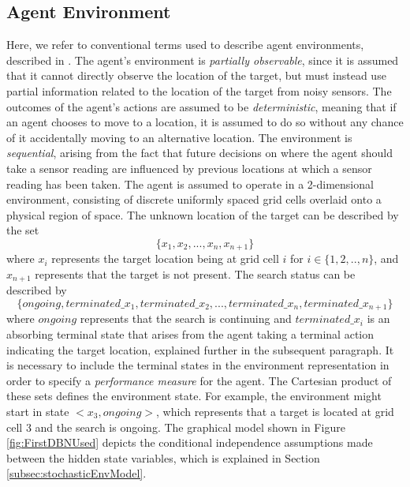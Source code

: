 \subsection{Agent Environment}
Here, we refer to conventional terms used to describe agent environments, described in \cite[p.~41]{AIAMA}. The agent's environment is \textit{partially observable}, since it is assumed that it cannot directly observe the location of the target, but must instead use partial information related to the location of the target from noisy sensors. The outcomes of the agent's actions are assumed to be \textit{deterministic}, meaning that if an agent chooses to move to a location, it is assumed to do so without any chance of it accidentally moving to an alternative location. The environment is \textit{sequential}, arising from the fact that future decisions on where the agent should take a sensor reading are influenced by previous locations at which a sensor reading has been taken. The agent is assumed to operate in a 2-dimensional environment, consisting of discrete uniformly spaced grid cells overlaid onto a physical region of space.
The unknown location of the target can be described by the set
\[\{x_1, x_2, ..., x_n, x_{n+1}\}\]
where $x_i$ represents the target location being at grid cell $i$ for $i \in \{1, 2, .., n\}$, and $x_{n+1}$ represents that the target is not present. The search status can be described by 
\[ \{ongoing, terminated\_x_1, terminated\_x_2, ..., terminated\_x_n, terminated\_x_{n+1}\} \]
where $ongoing$ represents that the search is continuing and $terminated\_x_i$ is an absorbing terminal state that arises from the agent taking a terminal action indicating the target location, explained further in the subsequent paragraph. It is necessary to include the terminal states in the environment representation in order to specify a \textit{performance measure} for the agent. 
The Cartesian product of these sets defines the environment state. For example, the environment might start in state $<x_3, ongoing>$, which represents that a target is located at grid cell 3 and the search is ongoing. The graphical model shown in Figure \ref{fig:FirstDBNUsed} depicts the conditional independence assumptions made between the hidden state variables, which is explained in Section \ref{subsec:stochasticEnvModel}.
